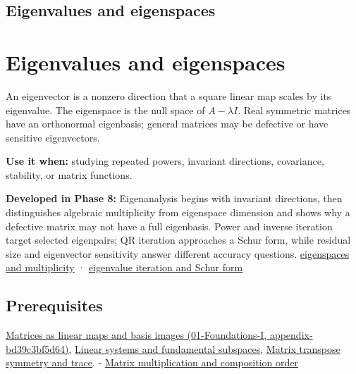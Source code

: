 \hypertarget{appendix-0b3be18411f9}{}
\section*{Eigenvalues and eigenspaces}
\chapter{Eigenvalues and eigenspaces}\label{appendix-0b3be18411f9-eigenvalues-and-eigenspaces}

An eigenvector is a nonzero direction that a square linear map scales by its eigenvalue. The eigenspace is the null space of \(A-\lambda I\). Real symmetric matrices have an orthonormal eigenbasis; general matrices may be defective or have sensitive eigenvectors.

\textbf{Use it when:} studying repeated powers, invariant directions, covariance, stability, or matrix functions.

\textbf{Developed in Phase 8:} Eigenanalysis begins with invariant directions, then distinguishes algebraic multiplicity from eigenspace dimension and shows why a defective matrix may not have a full eigenbasis. Power and inverse iteration target selected eigenpairs; QR iteration approaches a Schur form, while residual size and eigenvector sensitivity answer different accuracy questions. \href{Continuous\%20Notes/Computing\%20Foundations\%20-\%20From\%20Bits\%20to\%20C++\%20and\%20Systems\%20APIs\#Eigenvalues,\%20eigenspaces,\%20and\%20the\%20two\%20kinds\%20of\%20multiplicity}{eigenspaces and multiplicity} · \href{Continuous\%20Notes/Computing\%20Foundations\%20-\%20From\%20Bits\%20to\%20C++\%20and\%20Systems\%20APIs\#QR\%20iteration\%20and\%20Jacobi\%20rotations\%20preserve\%20the\%20spectrum\%20while\%20simplifying\%20shape}{eigenvalue iteration and Schur form}

\section{Prerequisites}\label{appendix-0b3be18411f9-prerequisites}

\href{../01-Foundations-I/main.pdf\#nameddest=appendix-bd39c3bf5d64}{Matrices as linear maps and basis images (01-Foundations-I, appendix-bd39c3bf5d64)}, \hyperref[appendix-8572a4a060c1]{Linear systems and fundamental subspaces}, \hyperref[appendix-175ca5ff874d]{Matrix transpose symmetry and trace}. - \hyperref[appendix-ab31ef447dbf]{Matrix multiplication and composition order}

